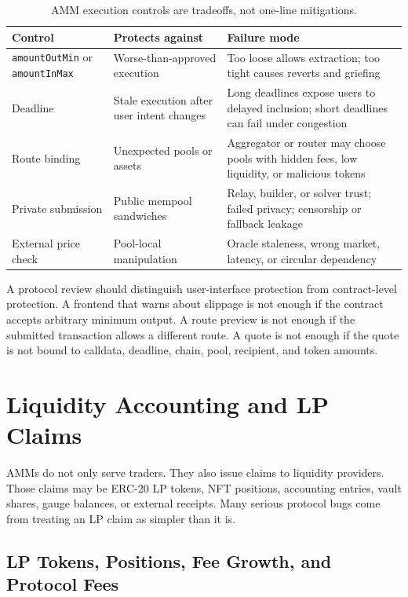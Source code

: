\begin{table}[htbp]
\centering
\small
\renewcommand{\arraystretch}{1.16}
\begin{tabularx}{\textwidth}{@{}>{\RaggedRight\arraybackslash}p{}>{\RaggedRight\arraybackslash}p{}X@{}}
\toprule
Control & Protects against & Failure mode \\
\midrule
\texttt{amountOutMin} or \texttt{amountInMax} & Worse-than-approved execution & Too loose allows extraction; too tight causes reverts and griefing \\
Deadline & Stale execution after user intent changes & Long deadlines expose users to delayed inclusion; short deadlines can fail under congestion \\
Route binding & Unexpected pools or assets & Aggregator or router may choose pools with hidden fees, low liquidity, or malicious tokens \\
Private submission & Public mempool sandwiches & Relay, builder, or solver trust; failed privacy; censorship or fallback leakage \\
External price check & Pool-local manipulation & Oracle staleness, wrong market, latency, or circular dependency \\
\bottomrule
\end{tabularx}
\caption{AMM execution controls are tradeoffs, not one-line mitigations.}
\end{table}

A protocol review should distinguish user-interface protection from contract-level protection. A frontend that warns about slippage is not enough if the contract accepts arbitrary minimum output. A route preview is not enough if the submitted transaction allows a different route. A quote is not enough if the quote is not bound to calldata, deadline, chain, pool, recipient, and token amounts.

\section{Liquidity Accounting and LP Claims}

AMMs do not only serve traders. They also issue claims to liquidity providers. Those claims may be ERC-20 LP tokens, NFT positions, accounting entries, vault shares, gauge balances, or external receipts. Many serious protocol bugs come from treating an LP claim as simpler than it is.

\subsection{LP Tokens, Positions, Fee Growth, and Protocol Fees}

